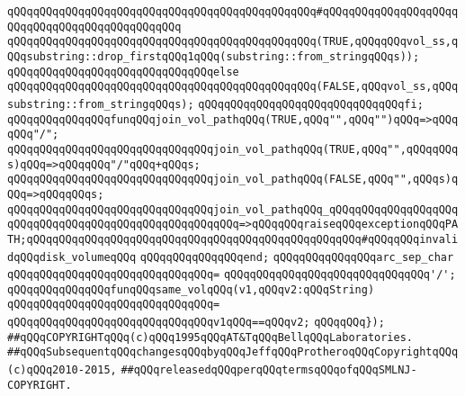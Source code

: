\verb|qQQqqQQqqQQqqQQqqQQqqQQqqQQqqQQqqQQqqQQqqQQqqQQq#qQQqqQQqqQQqqQQqqQQqqQQqqQQqqQQqqQQqqQQqqQQqqQQq|\newline
\verb|qQQqqQQqqQQqqQQqqQQqqQQqqQQqqQQqqQQqqQQqqQQqqQQq(TRUE,qQQqqQQqvol_ss,qQQqsubstring::drop_firstqQQq1qQQq(substring::from_stringqQQqs));|\newline
\verb|qQQqqQQqqQQqqQQqqQQqqQQqqQQqqQQqelse|\newline
\verb|qQQqqQQqqQQqqQQqqQQqqQQqqQQqqQQqqQQqqQQqqQQqqQQq(FALSE,qQQqvol_ss,qQQqsubstring::from_stringqQQqs);|\newline
\verb|qQQqqQQqqQQqqQQqqQQqqQQqqQQqqQQqfi;|\newline
\newline
\verb|qQQqqQQqqQQqqQQqfunqQQqjoin_vol_pathqQQq(TRUE,qQQq"",qQQq"")qQQq=>qQQqqQQq"/";|\newline
\verb|qQQqqQQqqQQqqQQqqQQqqQQqqQQqqQQqjoin_vol_pathqQQq(TRUE,qQQq"",qQQqqQQqs)qQQq=>qQQqqQQq"/"qQQq+qQQqs;|\newline
\verb|qQQqqQQqqQQqqQQqqQQqqQQqqQQqqQQqjoin_vol_pathqQQq(FALSE,qQQq"",qQQqs)qQQq=>qQQqqQQqs;|\newline
\verb|qQQqqQQqqQQqqQQqqQQqqQQqqQQqqQQqjoin_vol_pathqQQq_qQQqqQQqqQQqqQQqqQQqqQQqqQQqqQQqqQQqqQQqqQQqqQQqqQQqqQQq=>qQQqqQQqraiseqQQqexceptionqQQqPATH;qQQqqQQqqQQqqQQqqQQqqQQqqQQqqQQqqQQqqQQqqQQqqQQqqQQq#qQQqqQQqinvalidqQQqdisk_volumeqQQq|\newline
\verb|qQQqqQQqqQQqqQQqend;|\newline
\newline
\verb|qQQqqQQqqQQqqQQqarc_sep_char|\newline
\verb|qQQqqQQqqQQqqQQqqQQqqQQqqQQqqQQq=|\newline
\verb|qQQqqQQqqQQqqQQqqQQqqQQqqQQqqQQq'/';|\newline
\newline
\verb|qQQqqQQqqQQqqQQqfunqQQqsame_volqQQq(v1,qQQqv2:qQQqString)|\newline
\verb|qQQqqQQqqQQqqQQqqQQqqQQqqQQqqQQq=|\newline
\verb|qQQqqQQqqQQqqQQqqQQqqQQqqQQqqQQqv1qQQq==qQQqv2;|\newline
\newline
\verb|qQQqqQQq});|\newline
\newline
\newline
\newline
\verb|##qQQqCOPYRIGHTqQQq(c)qQQq1995qQQqAT&TqQQqBellqQQqLaboratories.|\newline
\verb|##qQQqSubsequentqQQqchangesqQQqbyqQQqJeffqQQqProtheroqQQqCopyrightqQQq(c)qQQq2010-2015,|\newline
\verb|##qQQqreleasedqQQqperqQQqtermsqQQqofqQQqSMLNJ-COPYRIGHT.|\newline

